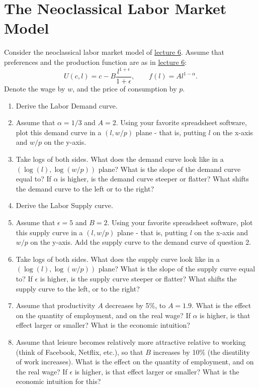 \documentclass[]{book}
\theoremstyle{definition}
\theoremstyle{definition}
\theoremstyle{definition}
\theoremstyle{remark}
\begin{document}
\section{The Neoclassical Labor Market
Model}\label{the-neoclassical-labor-market-model}

Consider the neoclassical labor market model of
\protect\hyperlink{labor-market}{lecture 6}. Assume that preferences and
the production function are as in
\protect\hyperlink{labor-market}{lecture 6}:
\[U(c, l)=c-B\frac{l^{1+\epsilon}}{1+\epsilon}, \qquad f(l)=Al^{1-\alpha}.\]
Denote the wage by \(w\), and the price of consumption by \(p\).

\begin{enumerate}
\def\labelenumi{\arabic{enumi}.}
\item
  Derive the Labor Demand curve.
\item
  Assume that \(\alpha=1/3\) and \(A=2\). Using your favorite
  spreadsheet software, plot this demand curve in a \((l, w/p)\) plane -
  that is, putting \(l\) on the x-axis and \(w/p\) on the y-axis.
\item
  Take logs of both sides. What does the demand curve look like in a
  \((\log(l), \log(w/p))\) plane? What is the slope of the demand curve
  equal to? If \(\alpha\) is higher, is the demand curve steeper or
  flatter? What shifts the demand curve to the left or to the right?
\item
  Derive the Labor Supply curve.
\item
  Assume that \(\epsilon=5\) and \(B=2\). Using your favorite
  spreadsheet software, plot this supply curve in a \((l, w/p)\) plane -
  that is, putting \(l\) on the x-axis and \(w/p\) on the y-axis. Add
  the supply curve to the demand curve of question 2.
\item
  Take logs of both sides. What does the supply curve look like in a
  \((\log(l), \log(w/p))\) plane? What is the slope of the supply curve
  equal to? If \(\epsilon\) is higher, is the supply curve steeper or
  flatter? What shifts the supply curve to the left, or to the right?
\item
  Assume that productivity \(A\) decreases by 5\%, to \(A=1.9\). What is
  the effect on the quantity of employment, and on the real wage? If
  \(\alpha\) is higher, is that effect larger or smaller? What is the
  economic intuition?
\item
  Assume that leisure becomes relatively more attractive relative to
  working (think of Facebook, Netflix, etc.), so that \(B\) increases by
  10\% (the disutility of work increases). What is the effect on the
  quantity of employment, and on the real wage? If \(\epsilon\) is
  higher, is that effect larger or smaller? What is the economic
  intuition for this?
\end{enumerate}
\end{document}
